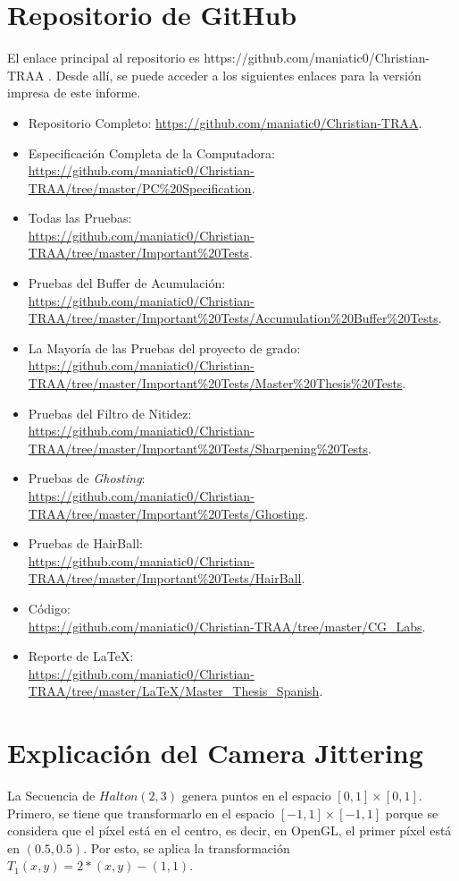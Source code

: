 \documentclass[pregrado]{tesis-usb} %
\begin{document}
\chapter{Repositorio de GitHub}
El enlace principal al repositorio es https://github.com/maniatic0/Christian-TRAA . Desde allí, se puede acceder a los siguientes enlaces para la versión impresa de este informe.
\begin{itemize}
	\item Repositorio Completo: \url{https://github.com/maniatic0/Christian-TRAA}.
	\item Especificación Completa de la Computadora: \\ \url{https://github.com/maniatic0/Christian-TRAA/tree/master/PC%20Specification}.
	\item Todas las Pruebas: \\ \url{https://github.com/maniatic0/Christian-TRAA/tree/master/Important%20Tests}.
	\item Pruebas del Buffer de Acumulación: \\ \url{https://github.com/maniatic0/Christian-TRAA/tree/master/Important%20Tests/Accumulation%20Buffer%20Tests}.
	\item La Mayoría de las Pruebas del proyecto de grado: \\ \url{https://github.com/maniatic0/Christian-TRAA/tree/master/Important%20Tests/Master%20Thesis%20Tests}.
	\item Pruebas del Filtro de Nitidez: \\ \url{https://github.com/maniatic0/Christian-TRAA/tree/master/Important%20Tests/Sharpening%20Tests}.
	\item Pruebas de \textit{Ghosting}: \\ \url{https://github.com/maniatic0/Christian-TRAA/tree/master/Important%20Tests/Ghosting}.
	\item Pruebas de HairBall: \\ \url{https://github.com/maniatic0/Christian-TRAA/tree/master/Important%20Tests/HairBall}.
	\item Código: \\ \url{https://github.com/maniatic0/Christian-TRAA/tree/master/CG_Labs}.
	\item Reporte de \LaTeX: \\ \url{https://github.com/maniatic0/Christian-TRAA/tree/master/LaTeX/Master_Thesis_Spanish}.
\end{itemize}
\chapter{Explicación del Camera Jittering} \label{appendix:jitter}
La Secuencia de $Halton(2, 3)$ genera puntos en el espacio $[0,1] \times [0,1]$. Primero, se tiene que transformarlo en el espacio $[- 1,1] \times [-1,1]$ porque se considera que el píxel está en el centro, es decir, en OpenGL, el primer píxel está en $(0.5, 0.5)$. Por esto, se aplica la transformación $T_1 (x, y) = 2 * (x, y) - (1, 1)$.
\end{document}
